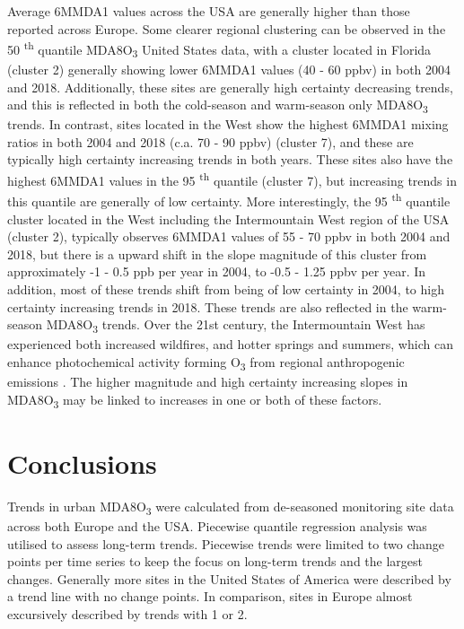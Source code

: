 \documentclass[journal abbreviation, manuscript]{copernicus}
\begin{document}
Average 6MMDA1 values across the USA are generally higher than those reported across Europe. Some clearer regional clustering can be observed in the 50 \textsuperscript{th} quantile MDA8O\textsubscript{3} United States data, with a cluster located in Florida (cluster 2) generally showing lower 6MMDA1 values (40 - 60 ppbv) in both 2004 and 2018. Additionally, these sites are generally high certainty decreasing trends, and this is reflected in both the cold-season and warm-season only MDA8O\textsubscript{3} trends. In contrast, sites located in the West show the highest 6MMDA1 mixing ratios in both 2004 and 2018 (c.a. 70 - 90 ppbv) (cluster 7), and these are typically high certainty increasing trends in both years. These sites also have the highest 6MMDA1 values in the 95 \textsuperscript{th} quantile (cluster 7), but increasing trends in this quantile are generally of low certainty. More interestingly, the 95 \textsuperscript{th} quantile cluster located in the West including the Intermountain West region of the USA (cluster 2), typically observes 6MMDA1 values of 55 - 70 ppbv in both 2004 and 2018, but there is a upward shift in the slope magnitude of this cluster from approximately -1 - 0.5 ppb per year in 2004, to -0.5 - 1.25 ppbv per year. In addition, most of these trends shift from being of low certainty in 2004, to high certainty increasing trends in 2018. These trends are also reflected in the warm-season MDA8O\textsubscript{3} trends. Over the 21st century, the Intermountain West has experienced both increased wildfires, and hotter springs and summers, which can enhance photochemical activity forming O\textsubscript{3} from regional anthropogenic emissions \citep{Lin2017, Li2021, Peterson2021, Iglesias2022}. The higher magnitude and high certainty increasing slopes in MDA8O\textsubscript{3} may be linked to increases in one or both of these factors.

\section{Conclusions}  %

Trends in urban MDA8O\textsubscript{3} were calculated from de-seasoned monitoring site data across both Europe and the USA. Piecewise quantile regression analysis was utilised to assess long-term trends. Piecewise trends were limited to two change points per time series to keep the focus on long-term trends and the largest changes. Generally more sites in the United States of America were described by a trend line with no change points. In comparison, sites in Europe almost excursively described by trends with 1 or 2. 
\end{document}
